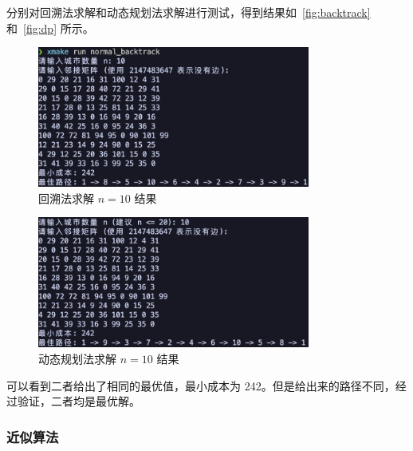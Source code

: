 分别对回溯法求解和动态规划法求解进行测试，得到结果如~\autoref{fig:backtrack} 和~\autoref{fig:dp} 所示。
\begin{figure}[htbp]
    \centering
    \includegraphics[width=0.8\textwidth]{images/backtrack.png}
    \caption{回溯法求解 $n=10$ 结果}
    \label{fig:backtrack}
\end{figure}
\begin{figure}[htbp]
    \centering
    \includegraphics[width=0.8\textwidth]{images/dp.png}
    \caption{动态规划法求解 $n=10$ 结果}
    \label{fig:dp}
\end{figure}

可以看到二者给出了相同的最优值，最小成本为 242。但是给出来的路径不同，经过验证，二者均是最优解。

\subsubsection{近似算法}

